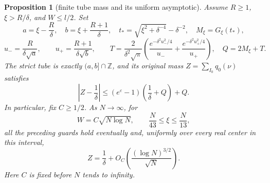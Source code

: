 \documentclass[11pt]{article}
\newtheorem{proposition}{Proposition}
\theoremstyle{remark}\newtheorem{remark}[proposition]{Remark}
\begin{document}
\begin{proposition}[finite tube mass and its uniform asymptotic]
\label{prop:mazur-tube-mass}
Assume $R\ge1$, $\xi>R/\delta$, and $W\le l/2$. Set
\[
 a=\xi-\frac R\delta,\quad b=\xi+\frac{R+1}{\delta},\quad
 t_*=\sqrt{\xi^2+\delta^{-4}}-\delta^{-2},\quad
 M_\xi=G_\xi(t_*),
\]
\[
 u_-=\frac{R}{\delta\sqrt a},\qquad
 u_+=\frac{R+1}{\delta\sqrt b},\qquad
 T=\frac{2}{\delta^2\sqrt\pi}
   \left(\frac{e^{-\delta^2u_-^2/4}}{u_-}
              +\frac{e^{-\delta^2u_+^2/4}}{u_+}\right),\quad
 Q=2M_\xi+T.
\]
The strict tube is exactly $(a,b]\cap\mathbb Z$, and its original
mass $Z=\sum_{I_0}q_0(\nu)$ satisfies
\begin{equation}
 \left|Z-\frac1\delta\right|
 \le (e^\varepsilon-1)\left(\frac1\delta+Q\right)+Q.
 \label{eq:mazur-finite-mass}
\end{equation}
In particular, fix $C\ge1/2$. As $N\to\infty$, for
\[
 W=C\sqrt{N\log N},\qquad \frac N{43}\le\xi\le\frac N{13},
\]
all the preceding guards hold eventually and, uniformly over every
real center in this interval,
\begin{equation}
 Z=\frac1\delta+
 O_C\!\left(\frac{(\log N)^{3/2}}{\sqrt N}\right).
 \label{eq:mazur-mass-asymptotic}
\end{equation}
Here $C$ is fixed before $N$ tends to infinity.
\end{proposition}
\end{document}
